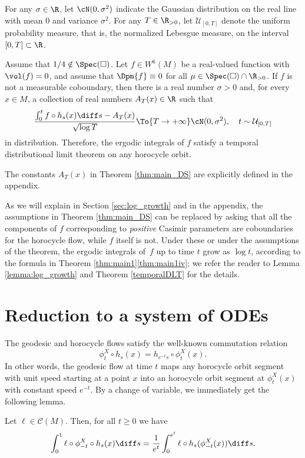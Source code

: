 For any $\sigma\in \R$, let $\cN(0,\sigma^{2})$ indicate the Gaussian distribution on the real line with mean $0$ and variance $\sigma^{2}$. For any $T\in \R_{>0}$, let $\mathcal{U}_{[0,T]}$ denote the uniform probability measure, that is, the normalized Lebesgue measure, on the interval $[0,T]\subset \R$.

\begin{theorem}\label{thm:main_DS}
Assume that $1/4 \notin \Spec(\square)$. Let $f \in W^6(M)$ be a real-valued function with $\vol(f)=0$, and assume that $\Dpm{f} \equiv 0$ for all $\mu \in \Spec(\square) \cap \R_{>0}$.
If $f$ is not a measurable coboundary, then there is a real number $\sigma>0$ and, for every $x \in M$, a collection of real numbers $A_T(x) \in \R$ such that
\[
\frac{\int_0^{t}f\circ h_s(x) \diff s - A_T(x)}{\sqrt{\log{T}}}\To{T\to+\infty}\cN(0,\sigma^{2}), \quad t\sim \mathcal{U}_{[0,T]}
\]
in distribution. Therefore, the ergodic integrals of $f$ satisfy a temporal distributional limit theorem on any horocycle orbit.
\end{theorem}

The constants $A_T(x)$ in Theorem \ref{thm:main_DS} are explicitly defined in the appendix.

\begin{remark}
As we will explain in Section \ref{sec:log_growth} and in the appendix, the assumptions in Theorem \ref{thm:main_DS} can be replaced by asking that all the components of $f$ corresponding to \emph{positive} Casimir parameters are coboundaries for the horocycle flow, while $f$ itself is not. Under these or under the assumptions of the theorem, the ergodic integrals of~$f$ up to time $t$ grow as $\log t$, according to the formula in Theorem \ref{thm:main1}\eqref{thm:main1iv}; we refer the reader to Lemma \ref{lemma:log_growth} and Theorem \ref{temporalDLT} for the details.
\end{remark}

\section{Reduction to a system of ODEs}\label{sec:reduction}

The geodesic and horocycle flows satisfy the well-known commutation relation
\[
\phi^X_t \circ h_s (x) = h_{e^{-t}s} \circ \phi^X_t(x).
\]
In other words, the geodesic flow at time $t$ maps any horocycle orbit segment with unit speed starting at a point $x$ into an horocycle orbit segment at $\phi^X_t(x)$ with constant speed $e^{-t}$.
By a change of variable, we immediately get the following lemma.
\begin{lemma}\label{lemma:c_o_v}
Let $\ell \in \mathscr{C}(M)$. Then, for all $t \geq 0$ we have
\[
\int_0^1 \ell \circ \phi^X_{-t}\circ h_s(x) \diff s = \frac{1}{e^t}\int_0^{e^t} \ell \circ h_s (\phi^X_{-t}(x)) \diff s.
\]
\end{lemma}

